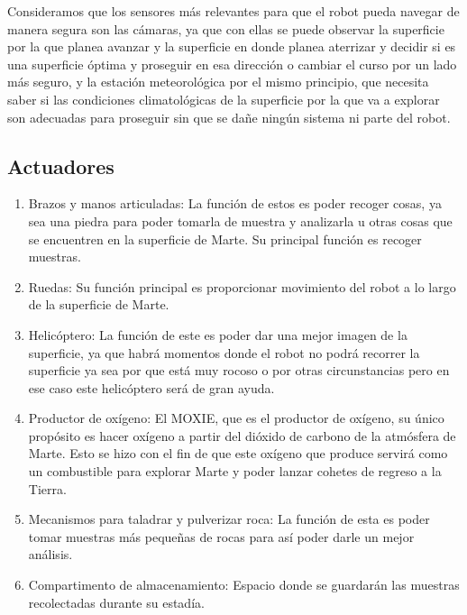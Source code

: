 \documentclass{article}
\begin{document}
        Consideramos que los sensores más relevantes para que el robot pueda navegar de manera segura son las cámaras, ya que con ellas se puede observar la superficie por la que planea avanzar y la superficie en donde planea aterrizar y decidir si es una superficie óptima y proseguir en esa dirección o cambiar el curso por un lado más seguro, y la estación meteorológica por el mismo principio, que necesita saber si las condiciones climatológicas de la superficie por la que va a explorar son adecuadas para proseguir sin que se dañe ningún sistema ni parte del robot.

        \subsection{Actuadores}
            \begin{enumerate}
                \item Brazos y manos articuladas: La función de estos es poder recoger cosas, ya sea una piedra para poder tomarla de muestra y analizarla u otras cosas que se encuentren en la superficie de Marte. Su principal función es recoger muestras. 
                \item Ruedas: Su función principal es proporcionar movimiento del robot a lo largo de la superficie de Marte.
                \item Helicóptero: La función de este es poder dar una mejor imagen de la superficie, ya que habrá momentos donde el robot no podrá recorrer la superficie ya sea por que está muy rocoso o por otras circunstancias pero en ese caso este helicóptero será de gran ayuda. 
                \item Productor de oxígeno: El MOXIE, que es el productor de oxígeno, su único propósito es hacer oxígeno a partir del dióxido de carbono de la atmósfera de Marte. Esto se hizo con el fin de que este oxígeno que produce servirá como un combustible para explorar Marte y poder lanzar cohetes de regreso a la Tierra.
                \item Mecanismos para taladrar y pulverizar roca: La función de esta es poder tomar muestras más pequeñas de rocas para así poder darle un mejor análisis. 
                \item Compartimento de almacenamiento: Espacio donde se guardarán las muestras recolectadas durante su estadía. 
            \end{enumerate}
\end{document}
